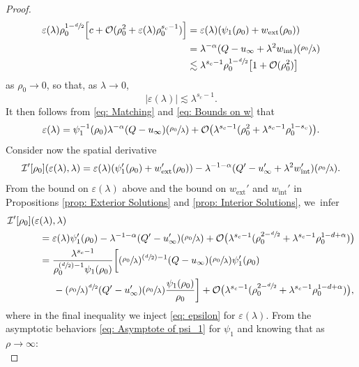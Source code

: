 \documentclass[JEP,XML,SOM,Unicode]{cedram}
\newcommand{\Psfrac}[2]{(\sfrac{#1}{#2})}
\theoremstyle{plain}
\theoremstyle{definition}
\DeclareMathOperator{\exterior}{ext}
\DeclareMathOperator{\interior}{int}
\begin{document}
\begin{proof}
\[
\begin{aligned}
\varepsilon(\lambda)\rho_0^{1-\sfrac{d}{2}}\Big[c+\mathcal O(\rho_0^2+\varepsilon(\lambda)\rho_0^{s_c-1})\Big]&= \varepsilon(\lambda)(\psi_1(\rho_0)+w_{\exterior}(\rho_0))\\
&=\lambda^{-\alpha}(Q-u_\infty+\lambda^2w_{\interior})(\sfrac{\rho_0}{\lambda})\\
&\lesssim \lambda^{s_c-1}\rho_0^{1-\sfrac{d}{2}}\big[1+\mathcal O(\rho_0^2)\big]
\end{aligned}
\]
as $\rho_0\to 0$, so that, as $\lambda\to 0$,
\[
|\varepsilon (\lambda)|\lesssim \lambda^{s_c-1}.
\]
It then follows from \eqref{eq: Matching} and \eqref{eq: Bounds on w} that
\begin{equation}
\label{eq: epsilon}
\varepsilon (\lambda) = \psi_1^{-1}(\rho_0)\lambda^{-\alpha}(Q-u_\infty )(\sfrac{\rho_0}{\lambda})+\mathcal O\big(\lambda^{s_c-1}(\rho_0^2+\lambda^{s_c-1}\rho_0^{1-s_c})\big).
\end{equation}
Consider now the spatial derivative
\[
\mathcal I'[\rho_0](\varepsilon(\lambda),\lambda)= \varepsilon(\lambda)(\psi_1'(\rho_0)+w_{\exterior}'(\rho_0))-\lambda^{-1-\alpha}(Q'-u_\infty'+\lambda^2w_{\interior}')(\sfrac{\rho_0}{\lambda}).
\]
From the bound on $\varepsilon(\lambda)$ above and the bound on $w_{\exterior}'$ and $w_{\interior}'$ in Propositions \ref{prop: Exterior Solutions} and \ref{prop: Interior Solutions}, we~infer
\[
\begin{aligned}
\mathcal I'[\rho_0](\varepsilon&(\lambda),\lambda)\\
&=\varepsilon(\lambda)\psi_1'(\rho_0)-\lambda^{-1-\alpha}(Q'-u_\infty')(\sfrac{\rho_0}{\lambda})+\mathcal O\big(\lambda^{s_c-1}(\rho_0^{2-\sfrac{d}{2}}+\lambda^{s_c-1}\rho_0^{1-d+\alpha})\big)\\
&=\frac{\lambda^{s_c-1}}{\rho_0^{\Psfrac{d}{2}-1}\psi_1(\rho_0)}\bigg[(\sfrac{\rho_0}{\lambda})^{\Psfrac{d}{2}-1}(Q-u_\infty)(\sfrac{\rho_0}{\lambda})\psi_1'(\rho_0)\\
&\hspace*{.5cm}-(\sfrac{\rho_0}{\lambda})^{\sfrac{d}{2}}(Q'-u_\infty')(\sfrac{\rho_0}{\lambda})\frac{\psi_1(\rho_0)}{\rho_0}\bigg]
+ \mathcal O\big(\lambda^{s_c-1}(\rho_0^{2-\sfrac{d}{2}}+\lambda^{s_c-1}\rho_0^{1-d+\alpha})\big),
\end{aligned}
\]
where in the final inequality we inject \eqref{eq: epsilon} for $\varepsilon(\lambda)$. From the asymptotic behaviors \eqref{eq: Asymptote of psi_1} for $\psi_1$ and knowing that as $\rho\to\infty$:
\begin{equation}

\end{equation}
\end{proof}
\end{document}
